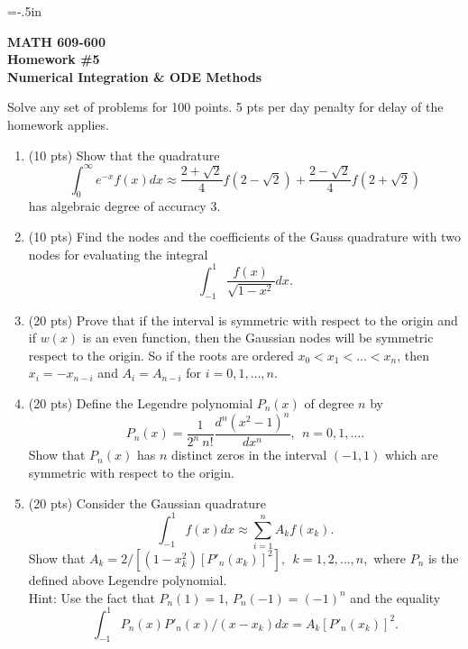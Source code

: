 \topmargin=-.5in
\textheight=9in
\oddsidemargin=0in
\evensidemargin=0in
\textwidth=6.6in
\pagestyle{empty}

\begin{center}
{\bf MATH 609-600 \\
Homework \#5 \\
Numerical  Integration \& ODE Methods}
\end{center}


\small  
\bigskip
\noindent
Solve any set of problems for 100 points.
5 pts per day penalty for delay of the homework applies.
 
\bigskip
\noindent


\begin{enumerate}

\item (10 pts) Show that the quadrature 
$$
 \displaystyle \int_{0}^{ \infty} e^{-x} f(x) dx \approx 
\frac{2+ \sqrt{2}}{4} f(2- \sqrt{2})+
\frac{2- \sqrt{2}}{4} f(2+ \sqrt{2})
$$
has algebraic degree of accuracy 3.


\item (10 pts) Find the nodes and the coefficients of the Gauss 
quadrature with two nodes for evaluating the integral
$$
\int_{-1}^1 \frac{f(x)}{\sqrt{1-x^2} } dx.
$$
 
\item  (20 pts)
Prove that if the interval is symmetric with respect to the
origin and if $w(x)$ is an even function, then the Gaussian 
nodes will be symmetric  respect to the
origin. So if the roots are ordered $x_0 < x_1 < \dots < x_n$, 
then $x_i=-x_{n-i}$ and $A_i=A_{n-i}$ for $i=0,1, \dots,n.$

\item (20 pts) Define the Legendre polynomial  $P_n(x)$ of degree $n$ by
$$
P_n(x)=\frac{1}{2^n ~n!}\frac{d^n(x^2-1)^n}{dx^n}, ~~ n=0,1, \dots.
$$
Show that   $P_n(x)$ has $n$ distinct zeros in the interval $(-1,1)$ which 
are symmetric with respect to the origin.

\item (20 pts) Consider the Gaussian quadrature %
$$
\int_{-1}^{1} f(x) dx \approx  \displaystyle \sum_{i=1}^{n} A_k f(x_k).
$$
Show that 
$%
A_k=2/[(1-x_k^2)[P'_n(x_k)]^2], ~~k=1,2,\dots, n,
$%
 where $P_n$ is the defined above Legendre polynomial. \\
Hint: Use the fact that 
$P_n(1)=1$, $P_n(-1)=(-1)^n$ and the equality
$$
\int_{-1}^{1}P_n(x) P'_n(x)/(x-x_k) dx= A_k[P'_n(x_k)]^2.
$$


\end{enumerate}
